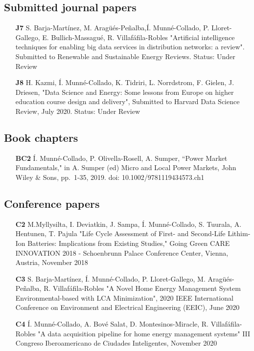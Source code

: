 \subsection*{Submitted journal papers}
\begin{itemize}
	\item [\textbf{J7}] S. Barja-Mart\'{i}nez, M. Arag\"{u}\'{e}s-Pe\~{n}alba,\'{I}. Munn\'{e}-Collado, P. Lloret-Gallego, E. Bullich-Massagu\'{e}, R. Villaf\'{a}fila-Robles "Artificial intelligence techniques for enabling big data services in distribution networks: a review". Submitted to Renewable and Sustainable Energy Reviews. Status: Under Review
	\item [\textbf{J8}] H. Kazmi, \'{I}. Munn\'{e}-Collado, K. Tidriri, L. Norrdstrom, F. Gielen, J. Driesen, "Data Science and Energy: Some lessons from Europe on higher education course design and delivery", Submitted to Harvard Data Science Review, July 2020. Status: Under Review
\end{itemize}

	
\subsection*{Book chapters}

\begin{itemize}
	\item[\textbf{BC2}] \'{I}. Munn\'{e}-Collado, P. Olivella-Rosell, A. Sumper, ``Power Market Fundamentals," in A. Sumper (ed) Micro and Local Power Markets, John Wiley \& Sons, pp.~1-35, 2019. doi: 10.1002/9781119434573.ch1
\end{itemize}	


\subsection*{Conference papers}

\begin{itemize}
	\item [\textbf{C2}] M.Myllysilta, I. Deviatkin, J. Sampa,  \'{I}. Munn\'{e}-Collado, S. Tuurala, A. Hentunen, T. Pajula  "Life Cycle Assessment of First- and Second-Life Lithim-Ion Batteries: Implications from Existing Studies," Going Green CARE INNOVATION 2018 - Schoenbrunn Palace Conference Center, Vienna, Austria, November 2018
	\item [\textbf{C3}] S. Barja-Mart\'{i}nez, \'{I}. Munn\'{e}-Collado, P. Lloret-Gallego, M. Arag\"{u}\'{e}s-Pe\~{n}alba, R. Villaf\'{a}fila-Robles "A Novel Home Energy Management System Environmental-based with LCA Minimization", 2020 IEEE International Conference on Environment and Electrical Engineering (EEIC), June 2020
	\item [\textbf{C4}] \'{I}. Munn\'{e}-Collado, A. Bov\'{e} Salat, D. Montesinos-Miracle, R. Villaf\'{a}fila-Robles "A data acquisition pipeline for home energy management systems" III Congreso Iberoamericano de Ciudades Inteligentes, November 2020

\end{itemize}


